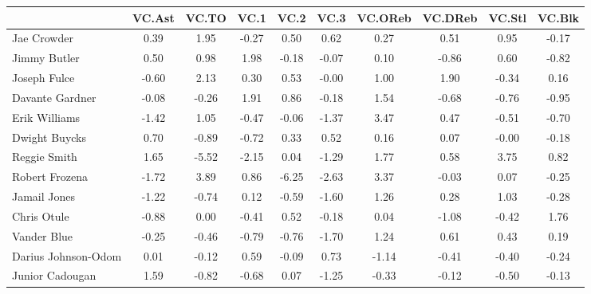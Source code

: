 \documentclass[10pt,letterpaper]{article}
\begin{document}
\begin{table}[ht]
\begin{center}
\begin{tabular}{lccccccccc}
  \hline
 & VC.Ast & VC.TO & VC.1 & VC.2 & VC.3 & VC.OReb & VC.DReb & VC.Stl & VC.Blk \\ 
  \hline
Jae Crowder & 0.39 & 1.95 & -0.27 & 0.50 & 0.62 & 0.27 & 0.51 & 0.95 & -0.17 \\ 
  Jimmy Butler & 0.50 & 0.98 & 1.98 & -0.18 & -0.07 & 0.10 & -0.86 & 0.60 & -0.82 \\ 
  Joseph Fulce & -0.60 & 2.13 & 0.30 & 0.53 & -0.00 & 1.00 & 1.90 & -0.34 & 0.16 \\ 
  Davante Gardner & -0.08 & -0.26 & 1.91 & 0.86 & -0.18 & 1.54 & -0.68 & -0.76 & -0.95 \\ 
  Erik Williams & -1.42 & 1.05 & -0.47 & -0.06 & -1.37 & 3.47 & 0.47 & -0.51 & -0.70 \\ 
  Dwight Buycks & 0.70 & -0.89 & -0.72 & 0.33 & 0.52 & 0.16 & 0.07 & -0.00 & -0.18 \\ 
  Reggie Smith & 1.65 & -5.52 & -2.15 & 0.04 & -1.29 & 1.77 & 0.58 & 3.75 & 0.82 \\ 
  Robert Frozena & -1.72 & 3.89 & 0.86 & -6.25 & -2.63 & 3.37 & -0.03 & 0.07 & -0.25 \\ 
  Jamail Jones & -1.22 & -0.74 & 0.12 & -0.59 & -1.60 & 1.26 & 0.28 & 1.03 & -0.28 \\ 
  Chris Otule & -0.88 & 0.00 & -0.41 & 0.52 & -0.18 & 0.04 & -1.08 & -0.42 & 1.76 \\ 
  Vander Blue & -0.25 & -0.46 & -0.79 & -0.76 & -1.70 & 1.24 & 0.61 & 0.43 & 0.19 \\ 
  Darius Johnson-Odom & 0.01 & -0.12 & 0.59 & -0.09 & 0.73 & -1.14 & -0.41 & -0.40 & -0.24 \\ 
  Junior Cadougan & 1.59 & -0.82 & -0.68 & 0.07 & -1.25 & -0.33 & -0.12 & -0.50 & -0.13 \\ 
   \hline
\end{tabular}
\end{center}
\end{table}
\end{document}
